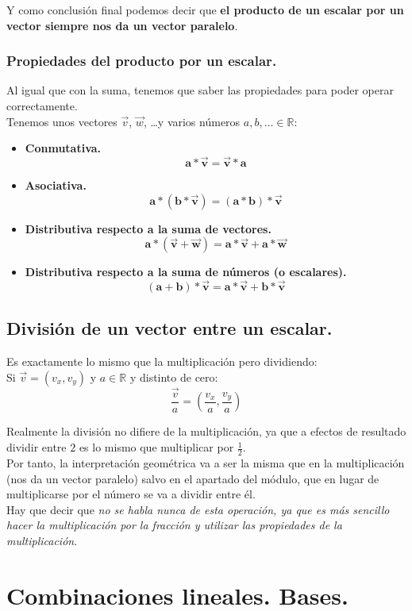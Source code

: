\documentclass[a4paper,11pt,answers]{exam}
\begin{document}
Y como conclusión final podemos decir que \textbf{el producto de un escalar por un vector
  siempre nos da un vector paralelo}.

\subsubsection{Propiedades del producto por un escalar.}
Al igual que con la suma, tenemos que saber las propiedades para poder operar correctamente.\\

Tenemos unos vectores $\vec{v}$, $\vec{w}$, \dots y varios números $a,b,\dots \in \mathbb{R}$:
\begin{itemize}
\item \textbf{Conmutativa.}
  \[\boldsymbol{a*\vec{v} = \vec{v}*a}\]
\item \textbf{Asociativa.}
  \[\boldsymbol{a*(b*\vec{v}) = (a*b)*\vec{v}}\]
\item \textbf{Distributiva respecto a la suma de vectores.}
  \[\boldsymbol{a*(\vec{v} + \vec{w}) = a*\vec{v} + a*\vec{w}}\]
\item \textbf{Distributiva respecto a la suma de números (o escalares).}
  \[\boldsymbol{(a+b)*\vec{v} = a*\vec{v} + b*\vec{v}}\]
\end{itemize}
\subsection{División de un vector entre un escalar.}
Es exactamente lo mismo que la multiplicación pero dividiendo:\\
Si $\vec{v} = (v_x, v_y)$ y $a \in \mathbb{R}$ y distinto de cero:
\[\frac{\vec{v}}{a} = \left(\frac{v_x}{a}, \frac{v_y}{a}\right)\]

Realmente la división no difiere de la multiplicación, ya que a efectos de resultado
dividir entre $2$ es lo mismo que multiplicar por $\frac{1}{2}$.\\
Por tanto, la interpretación geométrica va a ser la misma que en la multiplicación
(nos da un vector paralelo) salvo en el apartado del módulo, que en lugar de multiplicarse
por el número se va a dividir entre él.\\

Hay que decir que \emph{no se habla nunca de esta operación, ya que es más sencillo hacer la
multiplicación por la fracción y utilizar las propiedades de la multiplicación}.

\section{Combinaciones lineales. Bases.}
\end{document}

